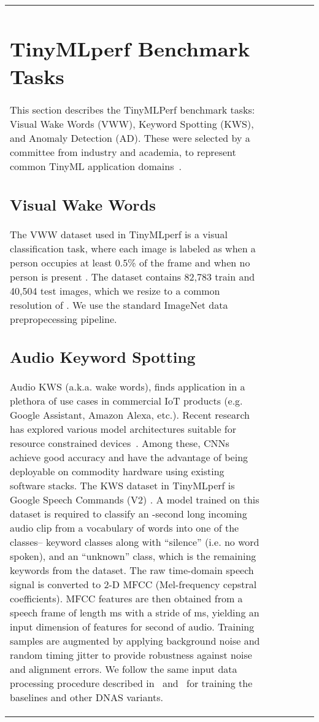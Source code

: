 \documentclass{article}
\begin{document}
\begin{table}[t]
\begin{tabular}{l| c | c | c | c | c}
\section{TinyMLperf Benchmark Tasks}
\label{sec:benchmarks}

This section describes the TinyMLPerf benchmark tasks: Visual Wake Words (VWW), Keyword Spotting (KWS), and Anomaly Detection (AD).
These were selected by a committee from industry and academia, to represent common TinyML application domains~\cite{banbury2020benchmarking}. 


\subsection{Visual Wake Words}
The VWW dataset used in TinyMLperf is a visual classification task, where each image is labeled as  when a person occupies at least 0.5\% of the frame and  when no person is present \cite{chowdhery2019visual}. The dataset contains 82,783 train and 40,504 test images, which we resize to a common resolution of . We use the standard ImageNet data prepropecessing pipeline. 

\subsection{Audio Keyword Spotting}
Audio KWS (a.k.a. wake words),
finds application in a plethora of use cases in commercial IoT products (e.g. Google Assistant, Amazon Alexa, etc.). 
Recent research has explored various model architectures suitable for resource constrained devices~\cite{kwsgnn,kwsatt,KusupatiSBKJV18,kron1}.
Among these, CNNs achieve good accuracy \cite{kwscnn1,kwscnn2,zhang2017hello,GopeMLSys2019} and have the advantage of being deployable on commodity hardware using existing software stacks.
The KWS dataset in TinyMLperf is Google Speech Commands (V2) \cite{warden2018speech}.
A model trained on this dataset is required to classify an -second long incoming audio clip from a vocabulary of  words into one of the  classes-- keyword classes along with ``silence'' (i.e. no word spoken), and an ``unknown'' class, which is the remaining  keywords from the dataset. 
The raw time-domain speech signal is converted to 2-D MFCC (Mel-frequency cepstral coefficients).
 MFCC features are then obtained from a speech frame of length ms with a stride of ms, yielding an input dimension of  features for  second of audio.
Training samples are augmented by applying background noise and random timing jitter to provide robustness against noise and alignment errors. We follow the same input data processing procedure described in~\citet{helloedge}
 and~\citet{mo2020neural} for training the baselines and other DNAS variants.














\end{tabular}
\end{table}
\end{document}
